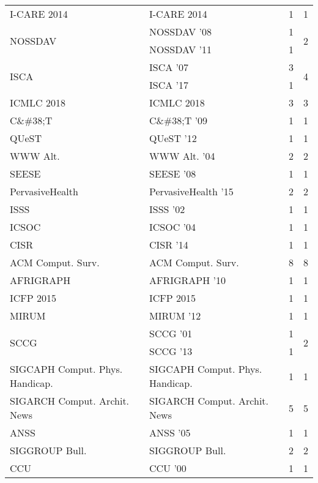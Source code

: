 \begin{table*}[t]
\begin{tabular}{llrr}
\multirow{1}{*}{I-CARE 2014} & I-CARE 2014 & 1 & \multirow{1}{*}{1}\\
\multirow{2}{*}{NOSSDAV } & NOSSDAV '08 & 1 & \multirow{2}{*}{2}\\
& NOSSDAV '11 & 1 &\\
\multirow{2}{*}{ISCA } & ISCA '07 & 3 & \multirow{2}{*}{4}\\
& ISCA '17 & 1 &\\
\multirow{1}{*}{ICMLC 2018} & ICMLC 2018 & 3 & \multirow{1}{*}{3}\\
\multirow{1}{*}{C\&\#38;T } & C\&\#38;T '09 & 1 & \multirow{1}{*}{1}\\
\multirow{1}{*}{QUeST } & QUeST '12 & 1 & \multirow{1}{*}{1}\\
\multirow{1}{*}{WWW Alt. } & WWW Alt. '04 & 2 & \multirow{1}{*}{2}\\
\multirow{1}{*}{SEESE } & SEESE '08 & 1 & \multirow{1}{*}{1}\\
\multirow{1}{*}{PervasiveHealth } & PervasiveHealth '15 & 2 & \multirow{1}{*}{2}\\
\multirow{1}{*}{ISSS } & ISSS '02 & 1 & \multirow{1}{*}{1}\\
\multirow{1}{*}{ICSOC } & ICSOC '04 & 1 & \multirow{1}{*}{1}\\
\multirow{1}{*}{CISR } & CISR '14 & 1 & \multirow{1}{*}{1}\\
\multirow{1}{*}{ACM Comput. Surv.} & ACM Comput. Surv. & 8 & \multirow{1}{*}{8}\\
\multirow{1}{*}{AFRIGRAPH } & AFRIGRAPH '10 & 1 & \multirow{1}{*}{1}\\
\multirow{1}{*}{ICFP 2015} & ICFP 2015 & 1 & \multirow{1}{*}{1}\\
\multirow{1}{*}{MIRUM } & MIRUM '12 & 1 & \multirow{1}{*}{1}\\
\multirow{2}{*}{SCCG } & SCCG '01 & 1 & \multirow{2}{*}{2}\\
& SCCG '13 & 1 &\\
\multirow{1}{*}{SIGCAPH Comput. Phys. Handicap.} & SIGCAPH Comput. Phys. Handicap. & 1 & \multirow{1}{*}{1}\\
\multirow{1}{*}{SIGARCH Comput. Archit. News} & SIGARCH Comput. Archit. News & 5 & \multirow{1}{*}{5}\\
\multirow{1}{*}{ANSS } & ANSS '05 & 1 & \multirow{1}{*}{1}\\
\multirow{1}{*}{SIGGROUP Bull.} & SIGGROUP Bull. & 2 & \multirow{1}{*}{2}\\
\multirow{1}{*}{CCU } & CCU '00 & 1 & \multirow{1}{*}{1}\\

\end{tabular}
\end{table*}
